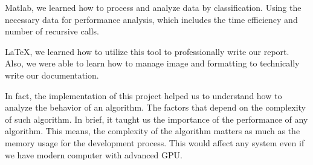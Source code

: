 \documentclass{sig-alternate}
\begin{document}
Matlab, we learned how to process and analyze data by classification. Using the necessary data for performance analysis, which includes the time efficiency and number of recursive calls. 
\newline

\LaTeX, we learned how to utilize this tool to professionally write our report. Also, we were able to learn how to manage image and formatting to technically write our documentation.
\newline 

In fact, the implementation of this project helped us to understand how to analyze the behavior of an algorithm. The factors that depend on the complexity of such algorithm. In brief, it taught us the importance of the performance of any algorithm. This means, the complexity of the algorithm matters as much as the memory usage for the development process. This would affect any system even if we have modern computer with advanced GPU.
\end{document}
